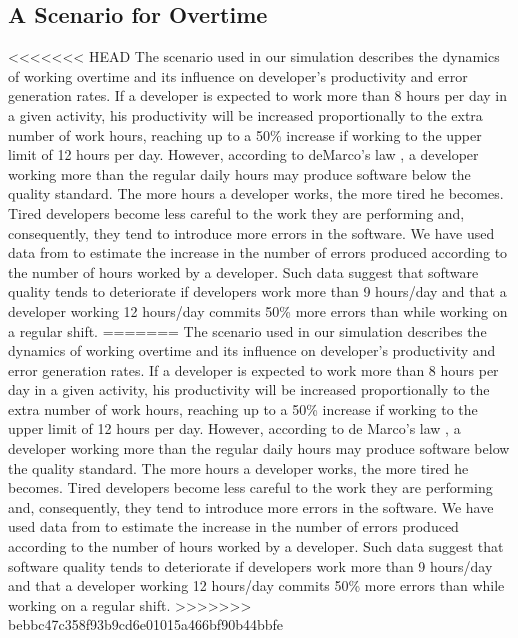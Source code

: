 \documentclass[conference]{IEEEtran}
\begin{document}
\subsection{A Scenario for Overtime}

<<<<<<< HEAD
The scenario used in our simulation describes the dynamics of working overtime and its influence on developer's productivity and error generation rates. If a developer is expected to work more than 8 hours per day in a given activity, his productivity will be increased proportionally to the extra number of work hours, reaching up to a 50\% increase if working to the upper limit of 12 hours per day. However, according to deMarco's law \cite{demarco:1999}, a developer working more than the regular daily hours may produce software below the quality standard. The more hours a developer works, the more tired he becomes. Tired developers become less careful to the work they are performing and, consequently, they tend to introduce more errors in the software. We have used data from \cite{Abdel-Hamid:1991}  to estimate the increase in the number of errors produced according to the number of hours worked by a developer. Such data suggest that software quality tends to deteriorate if developers work more than 9 hours/day and that a developer working 12 hours/day commits 50\% more errors than while working on a regular shift.
=======
The scenario used in our simulation describes the dynamics of working overtime and its influence on developer's productivity and error generation rates. If a developer is expected to work more than 8 hours per day in a given activity, his productivity will be increased proportionally to the extra number of work hours, reaching up to a 50\% increase if working to the upper limit of 12 hours per day. However, according to de Marco’s law \cite{demarco:1999}, a developer working more than the regular daily hours may produce software below the quality standard. The more hours a developer works, the more tired he becomes. Tired developers become less careful to the work they are performing and, consequently, they tend to introduce more errors in the software. We have used data from \cite{Abdel-Hamid:1991}  to estimate the increase in the number of errors produced according to the number of hours worked by a developer. Such data suggest that software quality tends to deteriorate if developers work more than 9 hours/day and that a developer working 12 hours/day commits 50\% more errors than while working on a regular shift.
>>>>>>> bebbc47c358f93b9cd6e01015a466bf90b44bbfe
\end{document}
